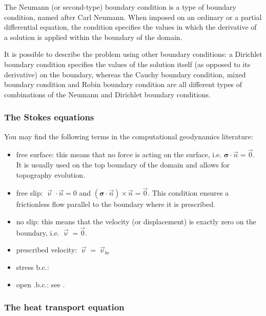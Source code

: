 The Neumann (or second-type) boundary condition is a type of boundary condition, 
named after Carl Neumann. When imposed on an ordinary or a partial differential equation, 
the condition specifies the values in which the derivative of a solution is 
applied within the boundary of the domain.

It is possible to describe the problem using other boundary conditions: 
a Dirichlet boundary condition specifies the values of the solution itself 
(as opposed to its derivative) on the boundary, whereas the Cauchy boundary condition, 
mixed boundary condition and Robin boundary condition are all different types of combinations 
of the Neumann and Dirichlet boundary conditions.


\subsubsection{The Stokes equations}

You may find the following terms in the computational geodynamics literature:

\begin{itemize}
\item { free surface}: this means that no force is acting on the surface, i.e. ${\bm \sigma}\cdot {\vec n}={\vec 0}$. It is usually used on the top boundary of the domain and allows for topography evolution.
\item { free slip}: ${\vec \upnu}\cdot \vec n = 0$ and $({\bm \sigma}\cdot{\vec n})\times {\vec n}={\vec 0}$. This condition ensures a frictionless flow parallel to the boundary where it is prescribed.
\item { no slip}: this means that the velocity (or displacement) is exactly zero on the boundary, i.e. ${\vec \upnu}={\vec 0}$.
\item { prescribed velocity}: ${\vec \upnu}={\vec \upnu}_{bc}$
\item stress b.c.: 
\item open .b.c.: see . 
\end{itemize}

\subsubsection{The heat transport equation}

